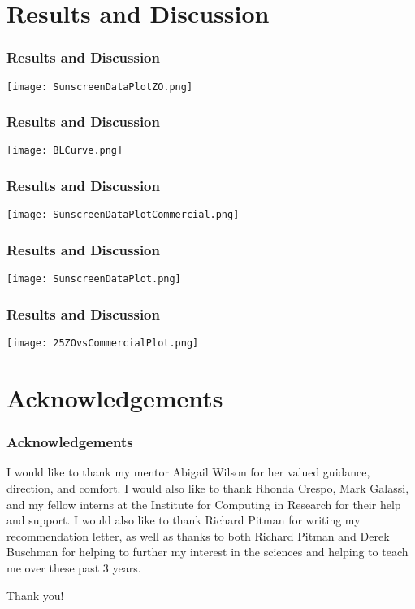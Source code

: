 \documentclass[10pt,aspectratio=169]{beamer} %
\begin{document}
\section{Results and Discussion}
\begin{frame}\centering
  \frametitle{Results and Discussion}
  \texttt{[image: SunscreenDataPlotZO.png]}
\end{frame}
\begin{frame}\centering
  \frametitle{Results and Discussion}
  \texttt{[image: BLCurve.png]}
\end{frame}
\begin{frame}\centering
  \frametitle{Results and Discussion}
  \texttt{[image: SunscreenDataPlotCommercial.png]}
\end{frame}
\begin{frame}\centering
  \frametitle{Results and Discussion}
  \texttt{[image: SunscreenDataPlot.png]}
\end{frame}
\begin{frame}\centering
  \frametitle{Results and Discussion}
  \texttt{[image: 25ZOvsCommercialPlot.png]}
\end{frame}

\section{Acknowledgements}
\begin{frame}\centering
  \frametitle{Acknowledgements}
  I would like to thank my mentor Abigail Wilson for her valued guidance, direction, and comfort. I would also like to thank Rhonda Crespo, Mark Galassi, and my fellow interns at the Institute for Computing in Research for their help and support. I would also like to thank Richard Pitman for writing my recommendation letter, as well as thanks to both Richard Pitman and Derek Buschman for helping to further my interest in the sciences and helping to teach me over these past 3 years.
\end{frame}
\begin{frame}\centering\Huge
  Thank you!
\end{frame}
\end{document}
